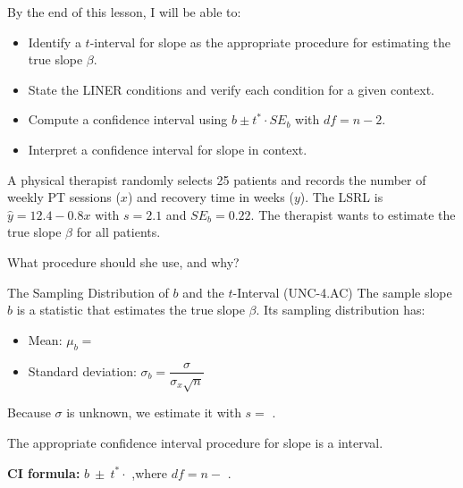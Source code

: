 \documentclass[10pt]{article}
\begin{document}
\namedateperiod

\begin{objectivebox}
By the end of this lesson, I will be able to:
\begin{itemize}
    \item[$\square$] Identify a $t$-interval for slope as the appropriate procedure for estimating the true slope $\beta$.
    \item[$\square$] State the LINER conditions and verify each condition for a given context.
    \item[$\square$] Compute a confidence interval using $b \pm t^* \cdot SE_b$ with $df = n - 2$.
    \item[$\square$] Interpret a confidence interval for slope in context.
\end{itemize}
\end{objectivebox}

\begin{vocabbox}
\end{vocabbox}

\begin{hookbox}
A physical therapist randomly selects 25 patients and records the number of weekly PT
sessions ($x$) and recovery time in weeks ($y$). The LSRL is $\hat{y} = 12.4 - 0.8x$
with $s = 2.1$ and $SE_b = 0.22$. The therapist wants to estimate the true slope $\beta$
for all patients.

What procedure should she use, and why? 
\end{hookbox}

\begin{notesbox}{The Sampling Distribution of $b$ and the $t$-Interval (UNC-4.AC)}
The sample slope $b$ is a statistic that estimates the true slope $\beta$.
Its sampling distribution has:
\begin{itemize}
    \item Mean: $\mu_b = $ \blank{2cm}
    \item Standard deviation: $\sigma_b = \dfrac{\sigma}{\sigma_x\sqrt{n}}$
\end{itemize}

\vspace{0.1in}
Because $\sigma$ is unknown, we estimate it with
$s = $ \blank{7cm}.

\vspace{0.15in}
The appropriate confidence interval procedure for slope is a \blank{3cm} interval.

\vspace{0.1in}
\textbf{CI formula:}\quad
$b\ \pm\ t^* \cdot$ \blank{3cm},\quad where $df = n -$ \blank{1cm}.
\end{notesbox}
\end{document}
